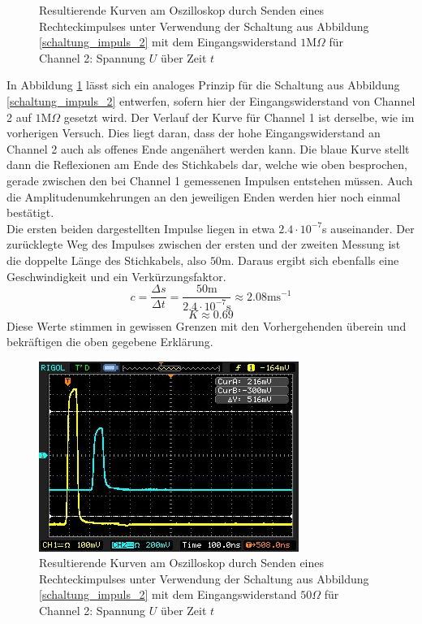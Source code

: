 		\begin{figure}[H]
			\center
			
			\caption{\centering Resultierende Kurven am Oszilloskop durch Senden eines Rechteckimpulses unter Verwendung der Schaltung aus Abbildung \ref{schaltung_impuls_2} mit dem Eingangswiderstand $1$M$\Omega$ für Channel 2: Spannung $U$ über Zeit $t$}
			\label{diagramm_impuls_2}
		\end{figure}

		In Abbildung \ref{diagramm_impuls_2} lässt sich ein analoges Prinzip für die Schaltung aus Abbildung \ref{schaltung_impuls_2} entwerfen, sofern hier der Eingangswiderstand von Channel 2 auf $1$M$\Omega$ gesetzt wird.
		Der Verlauf der Kurve für Channel 1 ist derselbe, wie im vorherigen Versuch.
		Dies liegt daran, dass der hohe Eingangswiderstand an Channel 2 auch als offenes Ende angenähert werden kann.
		Die blaue Kurve stellt dann die Reflexionen am Ende des Stichkabels dar, welche wie oben besprochen, gerade zwischen den bei Channel 1 gemessenen Impulsen entstehen müssen.
		Auch die Amplitudenumkehrungen an den jeweiligen Enden werden hier noch einmal bestätigt. \\

		Die ersten beiden dargestellten Impulse liegen in etwa $2.4\cdot 10^{-7}$s auseinander.
		Der zurücklegte Weg des Impulses zwischen der ersten und der zweiten Messung ist die doppelte Länge des Stichkabels, also $50$m.
		Daraus ergibt sich ebenfalls eine Geschwindigkeit und ein Verkürzungsfaktor.
		\[
			c = \dfrac{\Delta s}{\Delta t} = \dfrac{50\text{m}}{2.4\cdot 10^{-7}\text{s}} \approx 2.08\text{ms}^{-1}
		\]
		\[
			K \approx 0.69
		\]
		Diese Werte stimmen in gewissen Grenzen mit den Vorhergehenden überein und bekräftigen die oben gegebene Erklärung.

		\begin{figure}[H]
			\center
			\includegraphics[scale = 0.8]{messwerte/impuls-offen-03.jpg}
			\caption{\centering Resultierende Kurven am Oszilloskop durch Senden eines Rechteckimpulses unter Verwendung der Schaltung aus Abbildung \ref{schaltung_impuls_2} mit dem Eingangswiderstand $50\Omega$ für Channel 2: Spannung $U$ über Zeit $t$}
			\label{diagramm_impuls_3}
		\end{figure}

